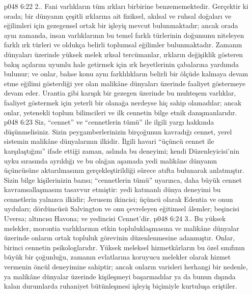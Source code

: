 \vs p048 6:22 2.\bibnobreakspace {}. Fani varlıkların tüm ırkları birbirine benzememektedir. Gerçektir ki orada; bir dünyanın çeşitli ırklarına ait fiziksel, akılsal ve ruhsal doğaları ve eğilimleri için gezegensel ortak bir işleyiş mevcut bulunmaktadır; ancak orada aynı zamanda, insan varlıklarının bu temel farklı türlerinin doğumunu niteleyen farklı ırk türleri ve oldukça belirli toplumsal eğilimler bulunmaktadır. Zamanın dünyaları üzerinde yüksek melek ırksal tercümanlar, ırkların değişiklik gösteren bakış açılarını uyumlu hale getirmek için ırk heyetlerinin çabalarına yardımda bulunur; ve onlar, bahse konu aynı farklılıkların belirli bir ölçüde kalmaya devam etme eğilimi gösterdiği yer olan malikâne dünyaları üzerinde faaliyet göstermeye devam eder. Urantia gibi karışık bir gezegen üzerinde bu muhteşem varlıklar, faaliyet göstermek için yeterli bir olanağa nerdeyse hiç sahip olamadılar; ancak onlar, yetenekli toplum bilimcileri ve ilk cennetin bilge etnik danışmanlarıdır.
\vs p048 6:23 Siz, “cennet” ve “cennetlerin tümü” ile ilgili yargı hakkında düşünmelisiniz. Sizin peygamberlerinizin birçoğunun kavradığı cennet, yerel sistemin malikâne dünyalarının ilkidir. İlgili havari “üçüncü cennet ile karşılaştığını” ifade ettiği zaman, aslında bu deneyimi; kendi Düzenleyicisi’nin uyku sırasında ayrıldığı ve bu olağan aşamada yedi malikâne dünyanın üçüncüsüne aktarılmasının gerçekleştirildiği sürece atıfta bulunarak anlatmıştır. Sizin bilge kişilerinizin bazısı; “cennetlerin tümü” uyarınca, daha büyük cennet kavramsallaşmasını tasavvur etmiştir: yedi katmanlı dünya deneyimi bu cennetlerin yalnızca ilkidir; Jerusem ikincisi; üçüncü olarak Edentia ve onun uyduları; dördüncüsü Salvington ve onu çevreleyen eğitimsel âlemler; beşincisi Uversa; altıncısı Havona; ve yedincisi Cennet’dir.
\vs p048 6:24 3.\bibnobreakspace {}. Bu yüksek melekler, morontia varlıklarının etkin topluluklaşmasına ve malikâne dünyalar üzerinde onların ortak topluluk görevinin düzenlenmesine adanmıştır. Onlar, birinci cennetin psikologlarıdır. Yüksek meleksel hizmetkârların bu özel sınıfının büyük bir çoğunluğu, zamanın evlatlarına koruyucu melekler olarak hizmet vermenin öncül deneyimine sahiptir; ancak onların varisleri herhangi bir nedenle, ya malikâne dünyalar üzerinde kişileşmeyi başarmadılar ya da bunun dışında kalan durumlarda ruhaniyet bütünleşmesi işleyiş biçimiyle kurtuluşa eriştiler.

